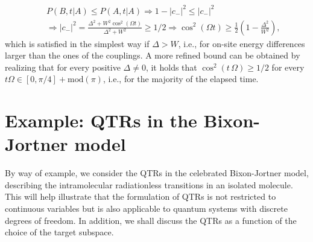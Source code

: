 \documentclass[prl,aps,amssymb,twocolumn,superscriptaddress, notitlepage, longbibliography]{revtex4-2}
\begin{document}
\begin{eqnarray}
    &&P(B,t\vert A)\leq P(A,t\vert A)\Rightarrow 1- \lvert c_-\rvert^2\leq \lvert c_-\rvert^2\\
    &&\Rightarrow \lvert c_-\rvert^2=\frac{\Delta^2+W^2\cos^2(\Omega t)}{\Delta^2+W^2}\geq 1/2\Rightarrow \cos^2\left(\Omega t\right)\geq\frac{1}{2}\left(1-\frac{\Delta^2}{W^2}\right),\nonumber
\end{eqnarray}
which is satisfied in the simplest way if $\Delta>W$, i.e., for on-site energy differences larger than the ones of the couplings. A more refined bound can be obtained by realizing that for every positive $\Delta\neq 0$, it holds that $\cos^2(t\,\Omega)\geq1/2$ for every $t\Omega\in[0,\pi/4]+\mathrm{mod}(\pi)$, i.e., for the majority of the elapsed time.



\section{Example:  QTRs in the Bixon-Jortner model}
By way of example, we consider the QTRs in the celebrated Bixon-Jortner model, describing the intramolecular radiationless transitions in an isolated molecule. This will help illustrate that the formulation of QTRs is not restricted to continuous variables but is also applicable to quantum systems with discrete degrees of freedom. In addition, we shall discuss the QTRs as a function of the choice of the target subspace.
\end{document}
